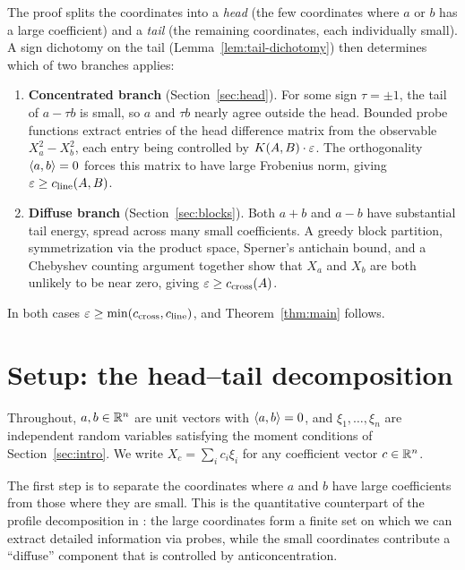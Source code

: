 The proof splits the coordinates into a \emph{head} (the few coordinates
where $a$ or $b$ has a large coefficient) and a \emph{tail} (the remaining
coordinates, each individually small). A sign dichotomy on the tail
(Lemma~\ref{lem:tail-dichotomy}) then determines which of two branches
applies:

\begin{enumerate}[label=(\roman*)]
\item \textbf{Concentrated branch} (Section~\ref{sec:head}).
For some sign $\tau = \pm 1$, the tail of $a - \tau b$ is small, so $a$ and
$\tau b$ nearly agree outside the head. Bounded probe functions extract
entries of the head difference matrix from the observable
$X_a^2 - X_b^2$, each entry being controlled by $K(A,B) \cdot \varepsilon$.
The orthogonality $\langle a,b\rangle = 0$ forces this matrix to have large Frobenius
norm, giving $\varepsilon \ge c_{\mathrm{line}}(A,B)$.

\item \textbf{Diffuse branch} (Section~\ref{sec:blocks}).
Both $a + b$ and $a - b$ have substantial tail energy, spread across many
small coefficients. A greedy block partition, symmetrization via the product
space, Sperner's antichain bound, and a Chebyshev counting argument
together show that $X_a$ and $X_b$ are both unlikely to be near zero,
giving $\varepsilon \ge c_{\mathrm{cross}}(A)$.
\end{enumerate}

\noindent
In both cases $\varepsilon \ge \min(c_{\mathrm{cross}}, c_{\mathrm{line}})$, and
Theorem~\ref{thm:main} follows.


\section{Setup: the head--tail decomposition}\label{sec:setup}

Throughout, $a, b \in \mathbb{R}^n$ are unit vectors with $\langle a,b\rangle = 0$, and
$\xi_1, \dots, \xi_n$ are independent random variables satisfying the moment
conditions of Section~\ref{sec:intro}. We write $X_c = \sum_i c_i \xi_i$ for
any coefficient vector $c \in \mathbb{R}^n$.

The first step is to separate the coordinates where $a$ and $b$ have large
coefficients from those where they are small. This is the quantitative
counterpart of the profile decomposition in \cite{compactness}: the large
coordinates form a finite set on which we can extract detailed information
via probes, while the small coordinates contribute a ``diffuse'' component
that is controlled by anticoncentration.

